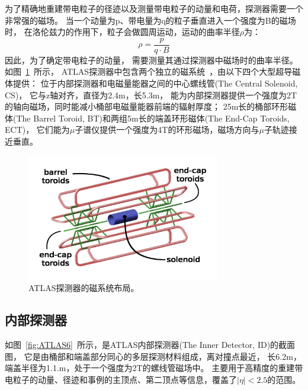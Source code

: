 为了精确地重建带电粒子的径迹以及测量带电粒子的动量和电荷，探测器需要一个非常强的磁场。
当一个动量为p、带电量为q的粒子垂直进入一个强度为B的磁场时，
在洛伦兹力的作用下，粒子会做圆周运动，运动的曲率半径$\rho$为：
\begin{equation} 
\label{eq:rhodef}
\rho=\frac{p}{q\cdot B}
\end{equation}
因此，为了确定带电粒子的动量，
需要测量其通过探测器中磁场时的曲率半径。
如图~\ref{fig:ATLAS5}~所示，
ATLAS探测器中包含两个独立的磁系统~\cite{ATLASMS}，由以下四个大型超导磁体提供：
位于内部探测器和电磁量能器之间的中心螺线管(The Central Solenoid, CS)，
它与z轴对齐，直径为2.4m，长5.3m，
能为内部探测器提供一个强度为2T的轴向磁场，同时能减小桶部电磁量能器前端的辐射厚度；
25m长的桶部环形磁体(The Barrel Toroid, BT)和两组5m长的端盖环形磁体(The End-Cap Toroids, ECT)，
它们能为$\mu$子谱仪提供一个强度为4T的环形磁场，磁场方向与$\mu$子轨迹接近垂直。

\begin{figure}
  \begin{center}
    \includegraphics[width=0.75\textwidth]{figuresEXP/ATLAS5.jpg}
  \end{center}
  \caption{
 ATLAS探测器的磁系统布局。
  }
    \label{fig:ATLAS5}
\end{figure}

\subsection{内部探测器}
\label{sec:ATLASID}

如图~\ref{fig:ATLAS6}~所示，是ATLAS内部探测器(The Inner Detector, ID)的截面图，
它是由桶部和端盖部分同心的多层探测材料组成，离对撞点最近，
长6.2m，端盖半径为1.1.m，处于一个强度为2T的螺线管磁场中。
主要用于高精度的重建带电粒子的动量、径迹和事例的主顶点、第二顶点等信息，覆盖了$|\eta|<2.5$的范围。


